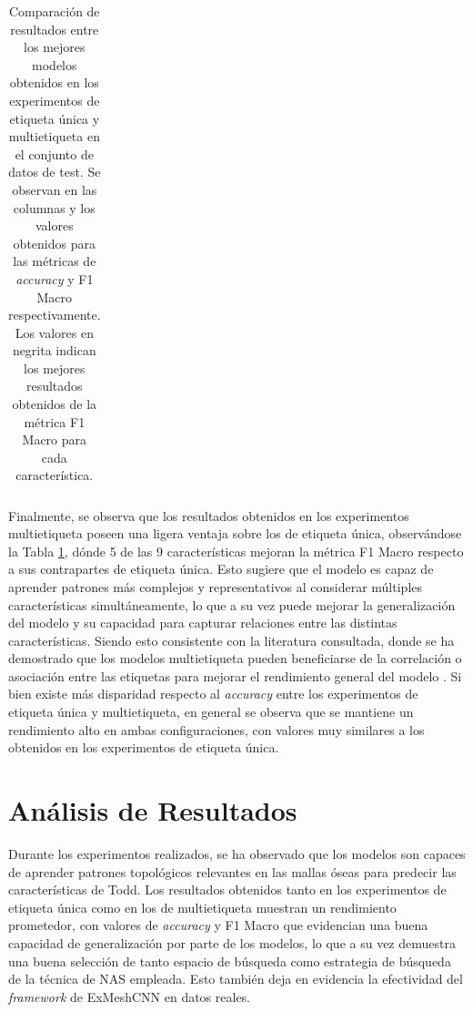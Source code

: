 \begin{table}[h]
\begin{tabular}{|c|cc|cc|}
    \end{tabular}
    \caption[Comparación de resultados entre los mejores modelos obtenidos en los experimentos de etiqueta única y multietiqueta]{Comparación de resultados entre los mejores modelos obtenidos en los experimentos de etiqueta única y multietiqueta en el conjunto de datos de test. Se observan en las columnas  y  los valores obtenidos para las métricas de \textit{accuracy} y F1 Macro respectivamente. Los valores en negrita indican los mejores resultados obtenidos de la métrica F1 Macro para cada característica.}
    \label{table5:multilabel_comparison}
\end{table}

Finalmente, se observa que los resultados obtenidos en los experimentos multietiqueta poseen una ligera ventaja sobre los de etiqueta única, observándose la Tabla \ref{table5:multilabel_comparison}, dónde 5 de las 9 características mejoran la métrica F1 Macro respecto a sus contrapartes de etiqueta única. Esto sugiere que el modelo es capaz de aprender patrones más complejos y representativos al considerar múltiples características simultáneamente, lo que a su vez puede mejorar la generalización del modelo y su capacidad para capturar relaciones entre las distintas características. Siendo esto consistente con la literatura consultada, donde se ha demostrado que los modelos multietiqueta pueden beneficiarse de la correlación o asociación entre las etiquetas para mejorar el rendimiento general del modelo \cite{ranjan_hyperface_2019}. Si bien existe más disparidad respecto al \textit{accuracy} entre los experimentos de etiqueta única y multietiqueta, en general se observa que se mantiene un rendimiento alto en ambas configuraciones, con valores muy similares a los obtenidos en los experimentos de etiqueta única.

\section{Análisis de Resultados}
Durante los experimentos realizados, se ha observado que los modelos son capaces de aprender patrones topológicos relevantes en las mallas óseas para predecir las características de Todd. Los resultados obtenidos tanto en los experimentos de etiqueta única como en los de multietiqueta muestran un rendimiento prometedor, con valores de \textit{accuracy} y F1 Macro que evidencian una buena capacidad de generalización por parte de los modelos, lo que a su vez demuestra una buena selección de tanto espacio de búsqueda como estrategia de búsqueda de la técnica de NAS empleada. Esto también deja en evidencia la efectividad del \textit{framework} de ExMeshCNN en datos reales.

